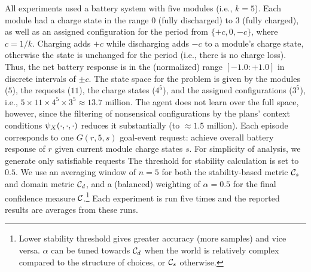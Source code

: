 All experiments used a battery system with five modules (i.e., $k=5$). 
%
Each module had a charge state in the range $0$ (fully discharged) to $3$ (fully charged), as well as an assigned configuration for the period from $\{+c, 0, -c\}$, where $c=1/k$.
%
%
Charging adds $+c$ while discharging adds $-c$ to a module's charge state, otherwise the state is unchanged for the period (i.e., there is no charge loss). Thus, the net battery response is in the (normalized) range $[-1.0:+1.0]$ in discrete intervals of $\pm c$. The state space for the problem is given by the modules ($5$), the requests ($11$), the charge states ($4^5$), and the assigned configurations ($3^5$), i.e., $5 \times 11 \times 4^5 \times 3^5 \approx 13.7$ million. The agent does not learn over the full space, however, since the filtering of nonsensical configurations by the plans' context conditions $\psi_X(\cdot,\cdot,\cdot)$ reduces it substantially (to $\approx1.5$ million).
%
Each episode corresponds to one $G(r,5,s)$ goal-event request: achieve overall battery response of $r$ given current module charge states $s$.  For simplicity of analysis, we generate only satisfiable requests
The threshold for stability calculation is set to $0.5$. We use an averaging window of $n=5$ for both the stability-based metric ${\mathcal{C}}_s$ and domain metric ${\mathcal{C}}_d$, and a (balanced) weighting of $\alpha=0.5$ for the final confidence measure ${\mathcal{C}}$.\footnote{Lower stability threshold gives greater accuracy (more samples) and vice versa. 
$\alpha$ can be tuned towards ${\mathcal{C}}_d$ when the world is relatively complex compared to the structure of choices, or ${\mathcal{C}}_s$ otherwise.
} Each experiment is run five times and the reported results are averages from these runs. 
%
